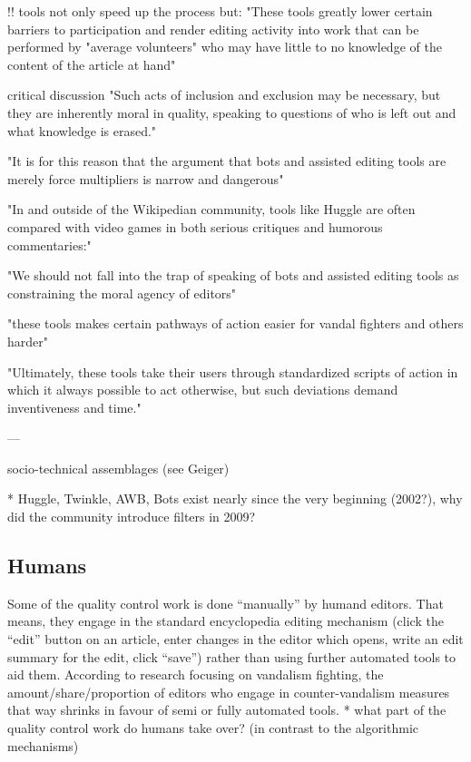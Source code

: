!! tools not only speed up the process but:
"These tools greatly lower certain barriers to participation and render editing
activity into work that can be performed by "average
volunteers" who may have little to no knowledge of the
content of the article at hand"

critical discussion
"Such acts of inclusion and exclusion may be necessary, but
they are inherently moral in quality, speaking to questions of
who is left out and what knowledge is erased."

"It is for
this reason that the argument that bots and assisted editing
tools are merely force multipliers is narrow and dangerous"

"In and outside of the Wikipedian community, tools
like Huggle are often compared with video games in both
serious critiques and humorous commentaries:"

"We should not fall into the trap of speaking of bots and
assisted editing tools as constraining the moral agency of
editors"

"these tools makes certain pathways of action easier for vandal
fighters and others harder"

"Ultimately, these tools take their users
through standardized scripts of action in which it always
possible to act otherwise, but such deviations demand
inventiveness and time."

---

socio-technical assemblages (see Geiger)

* Huggle, Twinkle, AWB, Bots exist nearly since the very beginning (2002?), why did the community introduce filters in 2009?

\subsection{Humans}

Some of the quality control work is done ``manually'' by humand editors.
That means, they engage in the standard encyclopedia editing mechanism (click the ``edit'' button on an article, enter changes in the editor which opens, write an edit summary for the edit, click ``save'') rather than using further automated tools to aid them.
According to research focusing on vandalism fighting, the amount/share/proportion of editors who engage in counter-vandalism measures that way shrinks in favour of semi or fully automated tools. %
* what part of the quality control work do humans take over? (in contrast to the algorithmic mechanisms)

